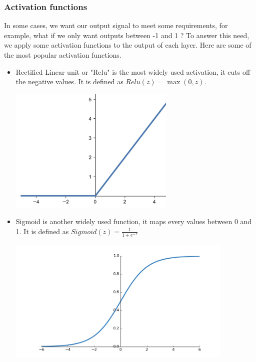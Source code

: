 \documentclass[12pt]{article}
\begin{document}
\subsubsection{Activation functions}
In some cases, we want our output signal to meet some requirements, for example, what if we only want outputs between -1 and 1 ? To answer this need, we apply some activation functions to the output of each layer. Here are some of the most popular activation functions. \\
\begin{itemize}

\newpage

\item Rectified Linear unit or "Relu" is the most widely used activation, it cuts off the negative values. It is defined as $ Relu(z) = \max(0, z)$. \\
\centerline{\includegraphics[height=6cm]{../../docs/relu.png}}

\item Sigmoid is another widely used function, it maps every values between 0 and 1. It is defined as $ Sigmoid(z) = \frac{1} {1 + e^{-z}}$ \\
\centerline{\includegraphics[height=6cm]{../../docs/sigmoid.png}}


\end{itemize}
\end{document}
